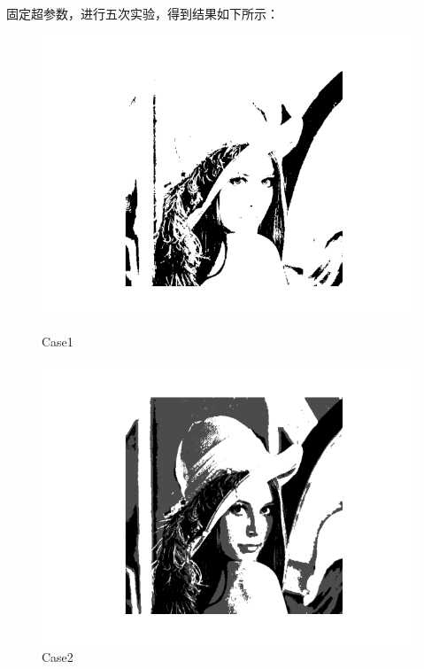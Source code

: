 \documentclass{article}
\begin{document}
固定超参数，进行五次实验，得到结果如下所示：

\begin{figure}[h]
	\begin{minipage}[t]{0.2\textwidth}%
		\centering
		\includegraphics[width=\textwidth]{SCA_1.png}
		\caption{Case1}%
		\end{minipage}
	\begin{minipage}[t]{0.2\textwidth}
		\centering
		\includegraphics[width=\textwidth]{SCA_2.png}
		\caption{Case2}
	\end{minipage}
	\begin{minipage}[t]{0.2\textwidth}
		\centering

\end{minipage}
\end{figure}
\end{document}
